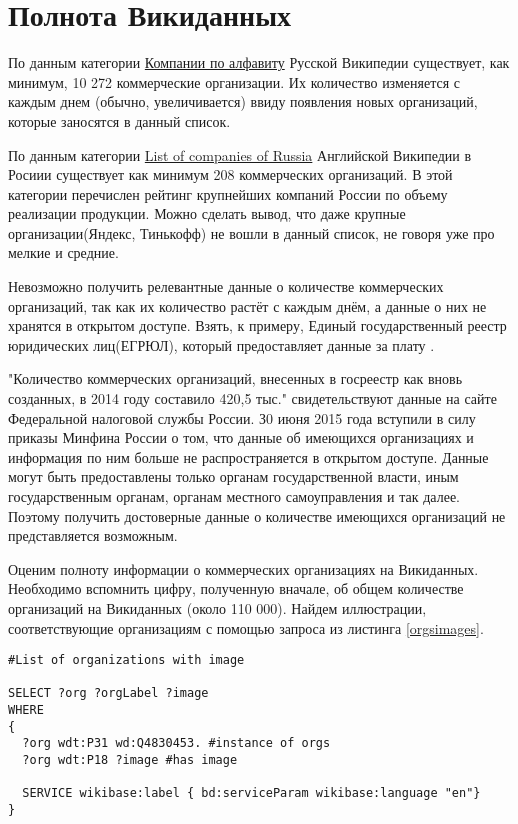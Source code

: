 \section*{Полнота Викиданных}

По данным категории \href{https://ru.wikipedia.org/wiki/%D0%9A%D0%B0%D1%82%D0%B5%D0%B3%D0%BE%D1%80%D0%B8%D1%8F:%D0%9A%D0%BE%D0%BC%D0%BF%D0%B0%D0%BD%D0%B8%D0%B8_%D0%BF%D0%BE_%D0%B0%D0%BB%D1%84%D0%B0%D0%B2%D0%B8%D1%82%D1%83}{Компании по алфавиту} Русской Википедии существует, как минимум, 10 272 коммерческие организации. Их количество изменяется с каждым днем (обычно, увеличивается) ввиду появления новых организаций, которые заносятся в данный список.

По данным категории \href{https://en.wikipedia.org/wiki/List_of_companies_of_Russia}{List of companies of Russia} Английской Википедии в Росиии существует как минимум 208 коммерческих организаций. В этой категории перечислен рейтинг крупнейших компаний России по объему реализации продукции. Можно сделать вывод, что даже крупные организации(Яндекс, Тинькофф) не вошли в данный список, не говоря уже про мелкие и средние.

Невозможно получить релевантные данные о количестве коммерческих организаций, так как их количество растёт с каждым днём, а данные о них не хранятся в открытом доступе. Взять, к примеру, Единый государственный реестр юридических лиц(ЕГРЮЛ), который предоставляет данные за плату \cite{egrul}.

"Количество коммерческих организаций, внесенных в госреестр как вновь созданных, в 2014 году составило 420,5 тыс."  свидетельствуют данные на сайте Федеральной налоговой службы России. З0 июня 2015 года вступили в силу приказы Минфина России о том, что данные об имеющихся организациях и информация по ним больше не распространяется в открытом доступе. Данные могут быть предоставлены только органам государственной власти, иным государственным органам, органам местного самоуправления и так далее. Поэтому получить достоверные данные о количестве имеющихся организаций не представляется возможным.

Оценим полноту информации о коммерческих организациях на Викиданных. Необходимо вспомнить цифру, полученную вначале, об общем количестве организаций на Викиданных (около 110 000). Найдем иллюстрации, соответствующие организациям с помощью запроса из листинга \ref{orgsimages}.

\begin{lstlisting}[language=SPARQL,label=orgsimages,caption=Организации с изображением]
#List of organizations with image

SELECT ?org ?orgLabel ?image
WHERE
{
  ?org wdt:P31 wd:Q4830453. #instance of orgs
  ?org wdt:P18 ?image #has image
  
  SERVICE wikibase:label { bd:serviceParam wikibase:language "en"}
}
\end{lstlisting}

